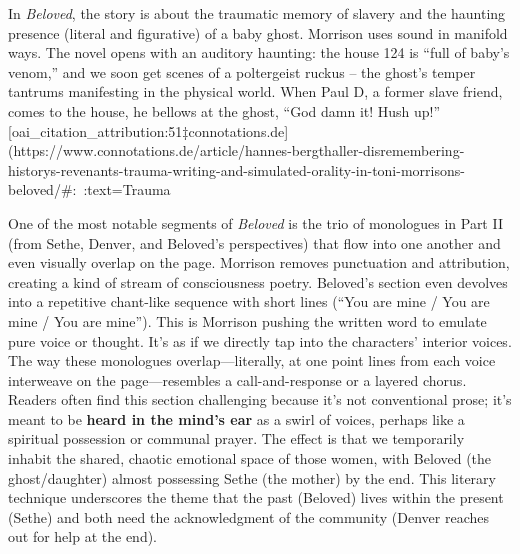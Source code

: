 \documentclass[12pt]{report}
\begin{document}
In \textit{Beloved}, the story is about the traumatic memory of slavery and the haunting presence (literal and figurative) of a baby ghost. Morrison uses sound in manifold ways. The novel opens with an auditory haunting: the house 124 is “full of baby’s venom,” and we soon get scenes of a poltergeist ruckus – the ghost’s temper tantrums manifesting in the physical world. When Paul D, a former slave friend, comes to the house, he bellows at the ghost, “God damn it! Hush up!” [oai_citation_attribution:51‡connotations.de](https://www.connotations.de/article/hannes-bergthaller-disremembering-historys-revenants-trauma-writing-and-simulated-orality-in-toni-morrisons-beloved/#:~:text=Trauma%

One of the most notable segments of \textit{Beloved} is the trio of monologues in Part II (from Sethe, Denver, and Beloved’s perspectives) that flow into one another and even visually overlap on the page. Morrison removes punctuation and attribution, creating a kind of stream of consciousness poetry. Beloved’s section even devolves into a repetitive chant-like sequence with short lines (“You are mine / You are mine / You are mine”). This is Morrison pushing the written word to emulate pure voice or thought. It’s as if we directly tap into the characters’ interior voices. The way these monologues overlap—literally, at one point lines from each voice interweave on the page—resembles a call-and-response or a layered chorus. Readers often find this section challenging because it’s not conventional prose; it’s meant to be \textbf{heard in the mind’s ear} as a swirl of voices, perhaps like a spiritual possession or communal prayer. The effect is that we temporarily inhabit the shared, chaotic emotional space of those women, with Beloved (the ghost/daughter) almost possessing Sethe (the mother) by the end. This literary technique underscores the theme that the past (Beloved) lives within the present (Sethe) and both need the acknowledgment of the community (Denver reaches out for help at the end).
\end{document}
